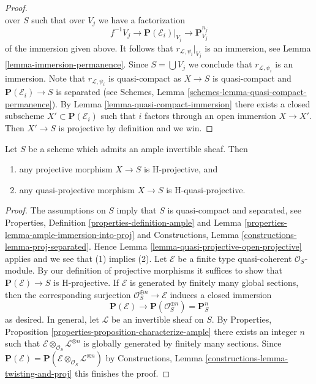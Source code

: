 \begin{proof}
$$$$
over $S$ such that over $V_j$ we have a factorization
$$
f^{-1}V_j \to \mathbf{P}(\mathcal{E}_i)|_{V_j} \to \mathbf{P}^{n_j}_{V_j}
$$
of the immersion given above. It follows that $r_{\mathcal{L}, \psi_i}|_{V_j}$
is an immersion, see Lemma \ref{lemma-immersion-permanence}.
Since $S = \bigcup V_j$ we conclude that $r_{\mathcal{L}, \psi_i}$
is an immersion.
Note that $r_{\mathcal{L}, \psi_i}$ is quasi-compact as
$X \to S$ is quasi-compact and $\mathbf{P}(\mathcal{E}_i) \to S$ is separated
(see Schemes, Lemma \ref{schemes-lemma-quasi-compact-permanence}).
By Lemma \ref{lemma-quasi-compact-immersion} there exists a closed
subscheme $X' \subset \mathbf{P}(\mathcal{E}_i)$ such that $i$ factors
through an open immersion $X \to X'$. Then $X' \to S$ is projective
by definition and we win.
\end{proof}

\begin{lemma}
\label{lemma-projective-over-quasi-projective-is-H-projective}
Let $S$ be a scheme which admits an ample invertible sheaf. Then
\begin{enumerate}
\item any projective morphism $X \to S$ is H-projective, and
\item any quasi-projective morphism $X \to S$ is H-quasi-projective.
\end{enumerate}
\end{lemma}

\begin{proof}
The assumptions on $S$ imply that $S$ is quasi-compact and separated, see
Properties, Definition \ref{properties-definition-ample} and
Lemma \ref{properties-lemma-ample-immersion-into-proj}
and Constructions, Lemma \ref{constructions-lemma-proj-separated}.
Hence Lemma \ref{lemma-quasi-projective-open-projective}
applies and we see that (1) implies (2).
Let $\mathcal{E}$ be a finite type quasi-coherent $\mathcal{O}_S$-module.
By our definition of projective morphisms it suffices to show that
$\mathbf{P}(\mathcal{E}) \to S$ is H-projective.
If $\mathcal{E}$ is generated by finitely many global sections,
then the corresponding surjection $\mathcal{O}_S^{\oplus n} \to \mathcal{E}$
induces a closed immersion
$$
\mathbf{P}(\mathcal{E}) \longrightarrow
\mathbf{P}(\mathcal{O}_S^{\oplus n}) = \mathbf{P}^n_S
$$
as desired. In general, let $\mathcal{L}$ be an invertible sheaf on $S$.
By Properties, Proposition \ref{properties-proposition-characterize-ample}
there exists an integer $n$ such that
$\mathcal{E} \otimes_{\mathcal{O}_S} \mathcal{L}^{\otimes n}$
is globally generated by finitely many sections. Since
$\mathbf{P}(\mathcal{E}) =
\mathbf{P}(\mathcal{E} \otimes_{\mathcal{O}_S} \mathcal{L}^{\otimes n})$ by
Constructions, Lemma \ref{constructions-lemma-twisting-and-proj}
this finishes the proof.
\end{proof}












